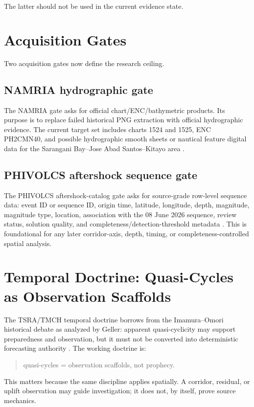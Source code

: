 \documentclass[11pt]{article}
\begin{document}
The latter should not be used in the current evidence state.

\section{Acquisition Gates}

Two acquisition gates now define the research ceiling.

\subsection{NAMRIA hydrographic gate}

The NAMRIA gate asks for official chart/ENC/bathymetric products. Its purpose is to replace failed historical PNG extraction with official hydrographic evidence. The current target set includes charts 1524 and 1525, ENC PH2CMN40, and possible hydrographic smooth sheets or nautical feature digital data for the Sarangani Bay--Jose Abad Santos--Kitayo area \cite{namria-gate}.

\subsection{PHIVOLCS aftershock sequence gate}

The PHIVOLCS aftershock-catalog gate asks for source-grade row-level sequence data: event ID or sequence ID, origin time, latitude, longitude, depth, magnitude, magnitude type, location, association with the 08 June 2026 sequence, review status, solution quality, and completeness/detection-threshold metadata \cite{phivolcs-catalog-gate}. This is foundational for any later corridor-axis, depth, timing, or completeness-controlled spatial analysis.

\section{Temporal Doctrine: Quasi-Cycles as Observation Scaffolds}

The TSRA/TMCH temporal doctrine borrows from the Imamura--Omori historical debate as analyzed by Geller: apparent quasi-cyclicity may support preparedness and observation, but it must not be converted into deterministic forecasting authority \cite{geller2023,imamura-omori}. The working doctrine is:
\begin{quote}
quasi-cycles = observation scaffolds, not prophecy.
\end{quote}

This matters because the same discipline applies spatially. A corridor, residual, or uplift observation may guide investigation; it does not, by itself, prove source mechanics.
\end{document}
